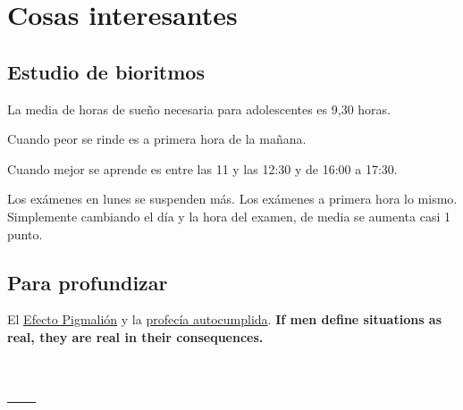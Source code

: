 \documentclass[palatino,nochap]{apuntesURJC}
\begin{document}
\chapter{Cosas interesantes}

\section{Estudio de bioritmos}

La media de horas de sueño necesaria para adolescentes es 9,30 horas.

Cuando peor se rinde es a primera hora de la mañana.

Cuando mejor se aprende es entre las 11 y las 12:30 y de 16:00 a 17:30.

Los exámenes en lunes se suspenden más. Los exámenes a primera hora lo mismo.
Simplemente cambiando el día y la hora del examen, de media se aumenta casi 1 punto.

\section{Para profundizar}


El \href{https://es.wikipedia.org/wiki/Efecto\_Pigmali\%C3\%B3n}{Efecto Pigmalión} y la \href{https://es.wikipedia.org/wiki/Profec\%C3\%ADa\_autocumplida}{profecía autocumplida}. 
%
\textbf{If men define situations as real, they are real in their consequences.} 




\appendix

\chapter{---}


\printindex
\end{document}

